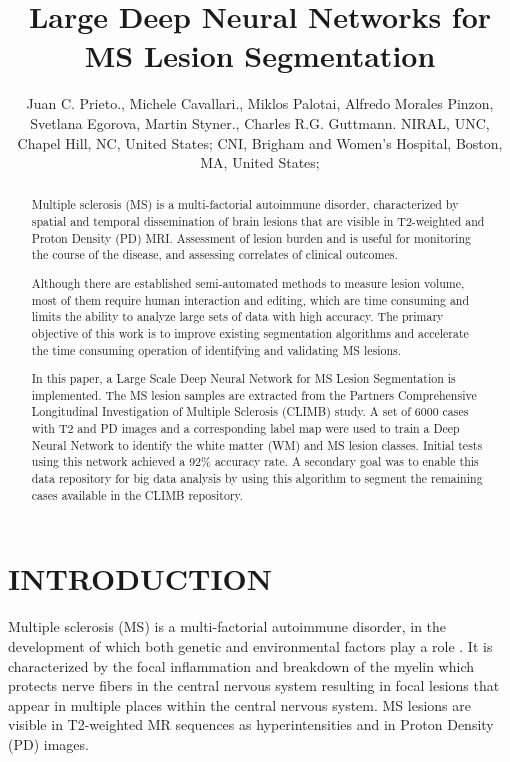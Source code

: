 \documentclass[]{spie}  %
\title{Large Deep Neural Networks for MS Lesion Segmentation}
\author{Juan C. Prieto.\supit{a}, Michele Cavallari.\supit{b}, Miklos Palotai\supit{b}, Alfredo Morales Pinzon\supit{b}, Svetlana Egorova\supit{b}, Martin Styner.\supit{a}, Charles R.G. Guttmann.\supit{b}
\skiplinehalf
\supit{a}NIRAL, UNC, Chapel Hill, NC, United States; 
\supit{b}CNI, Brigham and Women's Hospital, Boston, MA, United States;
}
\begin{document}
 
  \maketitle 

\begin{abstract}

Multiple sclerosis (MS) is a multi-factorial autoimmune disorder, characterized by spatial and temporal dissemination of brain lesions
that are visible in T2-weighted and Proton Density (PD) MRI.
Assessment of lesion burden and is useful for monitoring the course of the disease, 
and assessing correlates of clinical outcomes. 

Although there are established semi-automated methods to measure lesion volume, 
most of them require human interaction and editing, which are time consuming and limits the ability to analyze large sets of data
with high accuracy.  
The primary objective of this work is to 
improve existing segmentation algorithms and accelerate the time consuming operation of identifying and 
validating MS lesions. 

In this paper, a Large Scale Deep Neural Network for MS Lesion Segmentation is implemented.
The MS lesion samples are extracted from the Partners Comprehensive Longitudinal Investigation of Multiple Sclerosis (CLIMB) study. 
A set of 6000 cases with T2 and PD images and a corresponding label map were used to train a Deep Neural Network to identify 
the white matter (WM) and MS lesion classes. Initial tests using this network achieved a 92\% accuracy rate. 
A secondary goal was to enable this data repository for big data analysis by using this algorithm 
to segment the remaining cases available in the CLIMB repository. 

\end{abstract}



\section{INTRODUCTION}
\label{sec:intro}

Multiple sclerosis (MS) is a multi-factorial autoimmune disorder, in the development of which both genetic and environmental factors play a role \cite{taylor2011major}. It is characterized by the focal inflammation and breakdown of the myelin which protects nerve fibers in the central nervous system
resulting in focal lesions that appear in multiple places within the central nervous system.
MS lesions are visible in T2-weighted MR sequences as hyperintensities and in Proton Density (PD) 
images\cite{simon2006standardized}.
\end{document}
